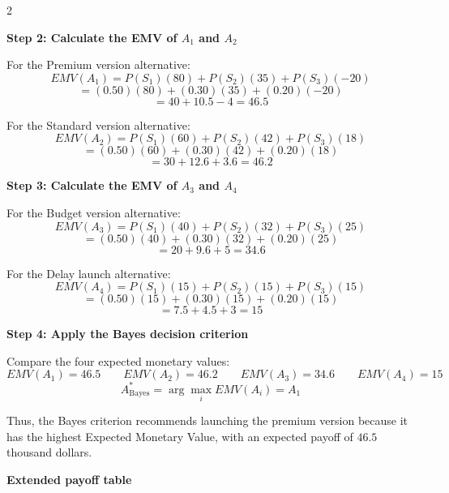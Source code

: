 	\begin{multicols}{2}
		\vspace{0pt}
		
		\textbf{Step 2: Calculate the EMV of $A_1$ and $A_2$}
		
		For the Premium version alternative:
		\[
		EMV(A_1)
		=
		P(S_1)(80)
		+
		P(S_2)(35)
		+
		P(S_3)(-20)
		\]
		\[
		=
		(0.50)(80)
		+
		(0.30)(35)
		+
		(0.20)(-20)
		\]
		\[
		=
		40+10.5-4
		=
		46.5
		\]
		
		\vspace{2mm}
		
		For the Standard version alternative:
		\[
		EMV(A_2)
		=
		P(S_1)(60)
		+
		P(S_2)(42)
		+
		P(S_3)(18)
		\]
		\[
		=
		(0.50)(60)
		+
		(0.30)(42)
		+
		(0.20)(18)
		\]
		\[
		=
		30+12.6+3.6
		=
		46.2
		\]
		
		\columnbreak
		
		\textbf{Step 3: Calculate the EMV of $A_3$ and $A_4$}
		
		For the Budget version alternative:
		\[
		EMV(A_3)
		=
		P(S_1)(40)
		+
		P(S_2)(32)
		+
		P(S_3)(25)
		\]
		\[
		=
		(0.50)(40)
		+
		(0.30)(32)
		+
		(0.20)(25)
		\]
		\[
		=
		20+9.6+5
		=
		34.6
		\]
		
		\vspace{2mm}
		
		For the Delay launch alternative:
		\[
		EMV(A_4)
		=
		P(S_1)(15)
		+
		P(S_2)(15)
		+
		P(S_3)(15)
		\]
		\[
		=
		(0.50)(15)
		+
		(0.30)(15)
		+
		(0.20)(15)
		\]
		\[
		=
		7.5+4.5+3
		=
		15
		\]
		
	\end{multicols}
	
	\setlength{\columnseprule}{0pt}
	
	\textbf{Step 4: Apply the Bayes decision criterion}
	
	Compare the four expected monetary values:
	$$
	EMV(A_1)=46.5
	\qquad
	EMV(A_2)=46.2
	\qquad
	EMV(A_3)=34.6
	\qquad
	EMV(A_4)=15
	$$
	$$
	A^*_{\mathrm{Bayes}}
	=
	\arg\max_i EMV(A_i)
	=
	A_1
	$$
	
	Thus, the Bayes criterion recommends launching the premium version because
	it has the highest Expected Monetary Value, with an expected payoff of
	$46.5$ thousand dollars.
	
	
	\newpage
	\textbf{Extended payoff table}
	

